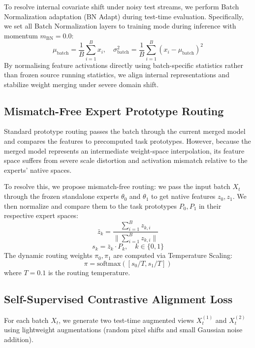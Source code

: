 \documentclass{article}
\theoremstyle{plain}
\theoremstyle{definition}
\theoremstyle{remark}
\begin{document}
To resolve internal covariate shift under noisy test streams, we perform Batch Normalization adaptation (BN Adapt) \cite{schneider20} during test-time evaluation. Specifically, we set all Batch Normalization layers to training mode during inference with momentum $m_{\text{BN}} = 0.0$:
\begin{equation}
    \mu_{\text{batch}} = \frac{1}{B} \sum_{i=1}^B x_i, \quad \sigma_{\text{batch}}^2 = \frac{1}{B} \sum_{i=1}^B (x_i - \mu_{\text{batch}})^2
\end{equation}
By normalising feature activations directly using batch-specific statistics rather than frozen source running statistics, we align internal representations and stabilize weight merging under severe domain shift.

\subsection{Mismatch-Free Expert Prototype Routing}
Standard prototype routing passes the batch through the current merged model and compares the features to precomputed task prototypes. However, because the merged model represents an intermediate weight-space interpolation, its feature space suffers from severe scale distortion and activation mismatch relative to the experts' native spaces. 

To resolve this, we propose mismatch-free routing: we pass the input batch $X_t$ through the frozen standalone experts $\theta_0$ and $\theta_1$ to get native features $z_0, z_1$. We then normalize and compare them to the task prototypes $P_0, P_1$ in their respective expert spaces:
\begin{equation}
    \bar{z}_k = \frac{\sum_{i=1}^B z_{k, i}}{\|\sum_{i=1}^B z_{k, i}\|}
\end{equation}
\begin{equation}
    s_k = \bar{z}_k \cdot P_k, \quad k \in \{0, 1\}
\end{equation}
The dynamic routing weights $\pi_0, \pi_1$ are computed via Temperature Scaling:
\begin{equation}
    \pi = \text{softmax}([s_0 / T, s_1 / T])
\end{equation}
where $T = 0.1$ is the routing temperature.

\subsection{Self-Supervised Contrastive Alignment Loss}
For each batch $X_t$, we generate two test-time augmented views $X_t^{(1)}$ and $X_t^{(2)}$ using lightweight augmentations (random pixel shifts and small Gaussian noise addition).
\end{document}
